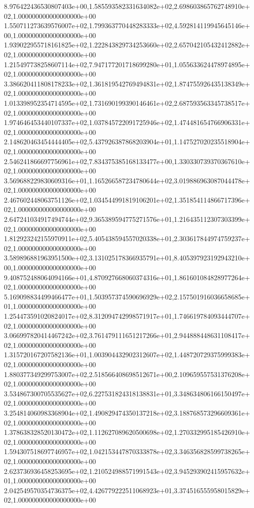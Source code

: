 8.976422436530807403e+00,1.585593582331634082e+02,2.698603865762748910e+02,1.000000000000000000e+00
1.550711273639576007e+02,1.799363770448283333e+02,4.592814119945645146e+00,1.000000000000000000e+00
1.939022955718161825e+02,1.222843829734253660e+02,2.657042105432412882e+02,1.000000000000000000e+00
1.215497738258607114e+02,7.947177201718699280e+01,1.055633624478974895e+02,1.000000000000000000e+00
3.386620411808178233e+02,1.361819542769494831e+02,1.874755926435138349e+02,1.000000000000000000e+00
1.013398952354714595e+02,1.731690199390146461e+02,2.687593563345738517e+02,1.000000000000000000e+00
1.974646453440107337e+02,1.037845722091725946e+02,1.474481654766906331e+02,1.000000000000000000e+00
2.148620463454444405e+02,5.437926387868203904e+01,1.147527020235518904e+02,1.000000000000000000e+00
2.546241866697756961e+02,7.834375385168133477e+00,1.330330739370367610e+02,1.000000000000000000e+00
3.569688229830609316e+01,1.165266587234780644e+02,3.019886963087044478e+02,1.000000000000000000e+00
2.467602448063751126e+02,1.034544991819106201e+02,1.351854114866717396e+02,1.000000000000000000e+00
2.647241034917494744e+02,9.365389594775271576e+01,1.216435112307303399e+02,1.000000000000000000e+00
1.812923242155970911e+02,5.405438594557020338e+01,2.303617844974759237e+02,1.000000000000000000e+00
3.589896881963951500e+02,3.131025178366935791e+01,8.405397923192943210e+00,1.000000000000000000e+00
9.408752488064094166e+01,4.870927668060374316e+01,1.861601084828977264e+02,1.000000000000000000e+00
5.169098834499466477e+01,1.503957374590696929e+02,2.157501916036658685e+01,1.000000000000000000e+00
1.254473591020824017e+02,8.312094742998571917e+01,1.746619784093444707e+02,1.000000000000000000e+00
3.066997820414467242e+02,3.761479111651217266e+01,2.944888448631108417e+02,1.000000000000000000e+00
1.315720167207582136e+01,1.003904432902312607e+02,1.448720729375999383e+02,1.000000000000000000e+00
1.880377349299753007e+02,2.518566408698512671e+00,2.109659557531376208e+02,1.000000000000000000e+00
3.534867300705535627e+02,6.227531824318138831e+01,3.348634806166150497e+02,1.000000000000000000e+00
3.254814060983368904e+02,1.490829474350137218e+02,3.188768573296609361e+02,1.000000000000000000e+00
1.378638328520130472e+02,1.112627089620500698e+02,1.270332995185426910e+02,1.000000000000000000e+00
1.594307518697746957e+02,1.042153447870333878e+02,3.346356828599738265e+02,1.000000000000000000e+00
2.623736936458253695e+02,1.210524988571991543e+02,3.945293902415957632e+01,1.000000000000000000e+00
2.042549570354736375e+02,4.426779222511068923e+01,3.374516555958015829e+02,1.000000000000000000e+00
